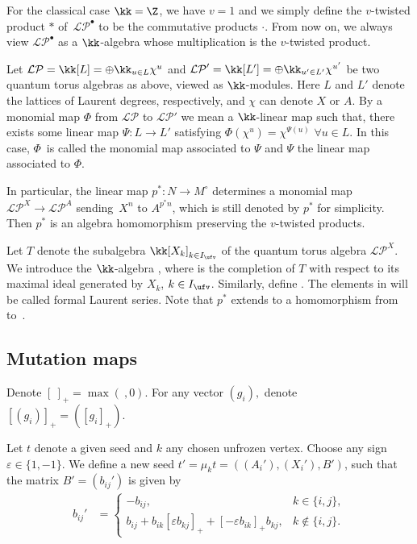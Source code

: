 \documentclass[pdftex]{sigma}
\newcommand{\Mc}{M^\circ}
\newcommand{\Iufv}{I_{\ufv}}
\newcommand{\LP}{{\mathcal{LP}}}
\newcommand{\hLP}{\widehat{\mathcal{LP}}}
\numberwithin{equation}{section}
\begin{document}
For the classical case $\kk=\Z$, we have $v=1$ and we simply define the $v$-twisted product $*$ of~$\LP^\bullet$ to be the commutative products $\cdot$. From now on, we always view $\LP^\bullet$ as a $\kk$-algebra whose multiplication is the $v$-twisted product.

Let $\LP=\kk[L]=\oplus \kk_{u\in L} \chi^u$ and $\LP'=\kk[L']=\oplus \kk_{u'\in L'} \chi^{u'}$ be two quantum torus algebras as above, viewed as $\kk$-modules. Here $L$ and $L'$ denote the lattices of Laurent degrees, respectively, and $\chi$ can denote $X$ or $A$. By a monomial map $\varPhi$ from $\LP$ to $\LP'$ we mean a $\kk$-linear map such that, there exists some linear map $\varPsi\colon L\rightarrow L'$ satisfying $\varPhi(\chi^u)=\chi^{\varPsi(u)}$ $\forall u\in L$. In this case, $\varPhi$~is called the monomial map associated to $\varPsi$ and $\varPsi$ the linear map associated to $\varPhi$.

In particular, the linear map $p^*\colon N\rightarrow \Mc$ determines a monomial map $\LP^X\rightarrow \LP^A$ sending~$X^n$ to $A^{p^* n}$, which is still denoted by $p^*$ for simplicity. Then $p^*$ is an algebra homomorphism preserving the $v$-twisted products.

Let $T$ denote the subalgebra $\kk[X_k]_{k\in \Iufv}$ of the quantum torus algebra $\LP^X$. We introduce the $\kk$-algebra \smash{$\hLP^X=\LP^X\otimes_T \hat{T}$}, where  is the completion of $T$ with respect to its maximal ideal generated by $X_k$, $k\in \Iufv$. Similarly, define \smash{$\hLP^A:=\LP^A\otimes_{p^*T}p^*\hat{T}$}. The elements in \smash{$\hLP^\bullet$} will be called formal Laurent series. Note that $p^*$ extends to a homomorphism from \smash{$\hLP^X$} to~\smash{$\hLP^A$}.

\subsection{Mutation maps}\label{sec:mutation}

Denote $[\ ]_{+}=\max(\ ,0)$. For any vector $(g_{i}),$ denote $[(g_{i})]_{+}=([g_{i}]_{+})$.

Let $t$ denote a given seed and $k$ any chosen unfrozen vertex.
Choose any sign $\varepsilon\in\{1,-1\}$. We define a new seed $t'=\mu_{k}t=((A_{i}'),(X_{i}'),B')$,
such that the matrix $B'=(b_{ij}')$ is given by
\begin{align*}
b_{ij}' & =\begin{cases}
-b_{ij}, & k\in\{i,j\},\\
b_{ij}+b_{ik}[\varepsilon b_{kj}]_{+}+[-\varepsilon b_{ik}]_{+}b_{kj}, & k\notin\{i,j\}.
\end{cases}
\end{align*}
\end{document}
